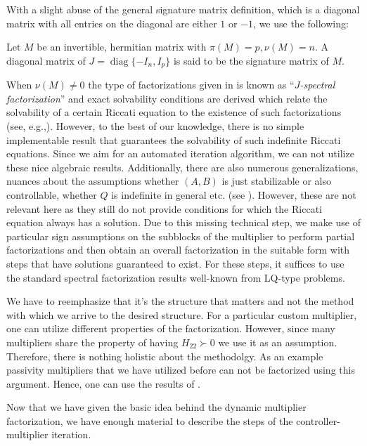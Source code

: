 With a slight abuse of the general signature matrix definition, which is a diagonal matrix with all entries on 
the diagonal are either $1$ or $-1$, we use the following: 
\begin{define} Let $M$ be an invertible, hermitian matrix with $\pi(M) = p,\nu(M)=n$. A diagonal matrix of 
$J= \operatorname{diag}\{-I_n,I_p\}$ is said to be the signature matrix of $M$. 
\end{define}
When $\nu(M)\neq 0$ the type of factorizations given in  is known as \enquote{\emph{$J$-spectral 
factorization}} and exact solvability conditions are derived which relate the solvability of a certain Riccati equation to the 
existence of such factorizations (see, e.g.,\cite{ranautomatica}). However, to the best of our knowledge, there 
is no simple implementable result that guarantees the solvability of such indefinite Riccati equations. 
Since we aim for an automated iteration 
algorithm, we can not utilize these nice algebraic results. Additionally, there are also numerous generalizations, 
nuances about the assumptions whether $(A,B)$ is just stabilizable or also controllable, whether $Q$ is indefinite 
in general etc. (see \cite{kucera}). However, these are not relevant here as they still do not provide 
conditions for which the Riccati equation always has a solution. Due to this missing technical step, 
we make use of particular sign assumptions on the subblocks of the multiplier to perform partial factorizations and 
then obtain an overall factorization in the suitable form with steps that have solutions guaranteed to exist. For 
these steps, it suffices to use the standard spectral factorization results well-known from LQ-type problems.
\begin{rem}
We have to reemphasize that it's the structure that matters and not 
the method with which we arrive to the desired structure. For a particular custom multiplier, one can utilize different properties
of the factorization. However, since many multipliers share the property of having $H_{22}\succ 0$ we use it as an assumption. 
Therefore, there is nothing holistic about the methodolgy. As an example passivity multipliers that we have utilized before 
can not be factorized using this argument. Hence, one can use the results of \cite{goh962}.
\end{rem}

Now that we have given the basic idea behind the dynamic multiplier factorization, we have enough material to 
describe the steps of the controller-multiplier iteration. 

